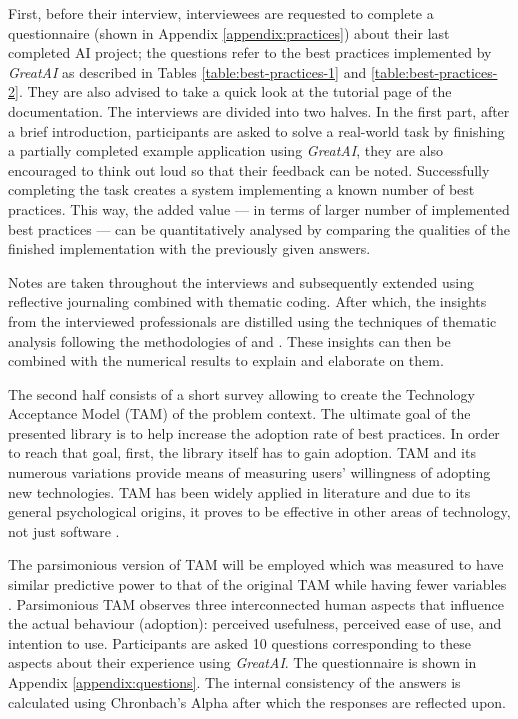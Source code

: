 First, before their interview, interviewees are requested to complete a questionnaire (shown in Appendix \ref{appendix:practices}) about their last completed AI project; the questions refer to the best practices implemented by \textit{GreatAI} as described in Tables \ref{table:best-practices-1} and \ref{table:best-practices-2}. They are also advised to take a quick look at the tutorial page of the documentation. The interviews are divided into two halves. In the first part, after a brief introduction, participants are asked to solve a real-world task by finishing a partially completed example application using \textit{GreatAI}, they are also encouraged to think out loud so that their feedback can be noted. Successfully completing the task creates a system implementing a known number of best practices. This way, the added value --- in terms of larger number of implemented best practices --- can be quantitatively analysed by comparing the qualities of the finished implementation with the previously given answers. 

Notes are taken throughout the interviews and subsequently extended using reflective journaling \cite{halcomb2006verbatim} combined with thematic coding. After which, the insights from the interviewed professionals are distilled using the techniques of thematic analysis \cite{fereday2006demonstrating} following the methodologies of \cite{cruz2019catalog} and \cite{haakman2021ai}. These insights can then be combined with the numerical results to explain and elaborate on them. 

The second half consists of a short survey allowing to create the Technology Acceptance Model (TAM) \cite{davis1989perceived} of the problem context. The ultimate goal of the presented library is to help increase the adoption rate of best practices. In order to reach that goal, first, the library itself has to gain adoption. TAM and its numerous variations provide means of measuring users' willingness of adopting new technologies. TAM has been widely applied in literature \cite{marangunic2015technology} and due to its general psychological origins, it proves to be effective in other areas of technology, not just software \cite{riemenschneider2002explaining}. 

The parsimonious version of TAM will be employed which was measured to have similar predictive power to that of the original TAM while having fewer variables \cite{wu2011user}. Parsimonious TAM observes three interconnected human aspects that influence the actual behaviour (adoption): perceived usefulness, perceived ease of use, and intention to use. Participants are asked 10 questions corresponding to these aspects about their experience using \textit{GreatAI}. The questionnaire is shown in Appendix \ref{appendix:questions}. The internal consistency of the answers is calculated using Chronbach's Alpha \cite{bland1997statistics} after which the responses are reflected upon.
